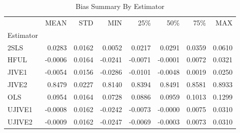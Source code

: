 \begin{table}[ht]
\centering
\caption{Bias Summary By Estimator}
\begin{tabular}{lrrrrrrr}
\toprule
 & MEAN & STD & MIN & 25\% & 50\% & 75\% & MAX \\
Estimator &  &  &  &  &  &  &  \\
\midrule
2SLS & 0.0283 & 0.0162 & 0.0052 & 0.0217 & 0.0291 & 0.0359 & 0.0610 \\
HFUL & -0.0006 & 0.0164 & -0.0241 & -0.0071 & -0.0001 & 0.0072 & 0.0321 \\
JIVE1 & -0.0054 & 0.0156 & -0.0286 & -0.0101 & -0.0048 & 0.0019 & 0.0250 \\
JIVE2 & 0.8479 & 0.0227 & 0.8140 & 0.8394 & 0.8491 & 0.8581 & 0.8933 \\
OLS & 0.0954 & 0.0164 & 0.0728 & 0.0886 & 0.0959 & 0.1013 & 0.1299 \\
UJIVE1 & -0.0008 & 0.0162 & -0.0242 & -0.0073 & -0.0000 & 0.0075 & 0.0310 \\
UJIVE2 & -0.0009 & 0.0162 & -0.0247 & -0.0069 & -0.0003 & 0.0073 & 0.0310 \\
\bottomrule
\end{tabular}
\end{table}
